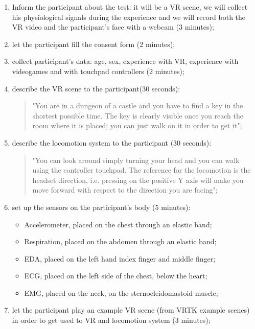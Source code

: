 \documentclass[binding=0.6cm,LaM]{sapthesis}
\begin{document}
\begin{enumerate}

\item Inform the participant about the test: it will be a VR scene, we will collect his physiological signals during the experience and we will record both the VR video and the participant's face with a webcam (3 minutes);

\item let the participant fill the consent form (2 minutes);

\item collect participant's data: age, sex, experience with VR, experience with videogames and with touchpad controllers (2 minutes);

\item describe the VR scene to the participant(30 seconds): 
\begin{quote}
"You are in a dungeon of a castle and you have to find a key in the shortest possible time. The key is clearly visible once you reach the room where it is placed; you can just walk on it in order to get it"; \end{quote}

\item describe the locomotion system to the participant (30 seconds):
\begin{quote}
"You can look around simply turning your head and you can walk using the controller touchpad. The reference for the locomotion is the headset direction, i.e. pressing on the positive Y axis will make you move forward with respect to the direction you are facing";
\end{quote}

\item set up the sensors on the participant's body (5 minutes):
\begin{itemize}
\item Accelerometer, placed on the chest through an elastic band;
\item Respiration, placed on the abdomen through an elastic band;
\item EDA, placed on the left hand index finger and middle finger;
\item ECG, placed on the left side of the chest, below the heart;
\item EMG, placed on the neck, on the sternocleidomastoid muscle;
\end{itemize} 

\item let the participant play an example VR scene (from VRTK example scenes) in order to get used to VR and locomotion system (3 minutes);


\end{enumerate}
\end{document}
